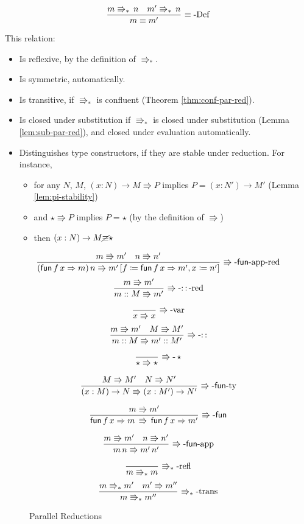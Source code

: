 \[
\frac{m\Rrightarrow_{\ast}\,n\quad m'\Rrightarrow_{\ast}\,n}{m\equiv m'}\,\operatorname{\equiv-Def}
\]
 
This relation:
\begin{itemize}
\item Is reflexive, by the definition of $\Rrightarrow_{\ast}$.
\item Is symmetric, automatically.
\item Is transitive, if $\Rrightarrow_{\ast}$ is confluent (Theorem \ref{thm:conf-par-red}).
\item Is closed under substitution if $\Rrightarrow_{\ast}$ is closed under substitution (Lemma \ref{lem:sub-par-red}), and closed under evaluation automatically.
\item Distinguishes type constructors, if they are stable under reduction.
For instance,
\begin{itemize}
\item for any $N$, $M$, $\left(x:N\right)\rightarrow M\Rrightarrow P$ implies $P=\left(x:N'\right)\rightarrow M'$ (Lemma \ref{lem:pi-stability})
\item and $\star\Rrightarrow P$ implies $P=\star$ (by the definition of $\Rrightarrow$)
\item then $\left(x:N\right)\rightarrow M\cancel{\equiv}\star$
\end{itemize}
\end{itemize}
\begin{figure}
\[
\frac{m\Rrightarrow m'\quad n\Rrightarrow n'}{\left(\mathsf{fun}\,f\,x\Rightarrow m\right)n\Rrightarrow m'\left[f\coloneqq\mathsf{fun}\,f\,x\Rightarrow m',x\coloneqq n'\right]}\,\operatorname{\Rrightarrow-\mathsf{fun}-app-red}
\]
\[
\frac{m\Rrightarrow m'}{m::M\Rrightarrow m'}\,\operatorname{\Rrightarrow-::-red}
\]
 
\[
\frac{\,}{x\Rrightarrow x}\,\operatorname{\Rrightarrow-var}
\]
\[
\frac{m\Rrightarrow m'\quad M\Rrightarrow M'}{m::M\Rrightarrow m'::M'}\,\operatorname{\Rrightarrow-::}
\]
 
\[
\frac{\,}{\star\Rrightarrow\star}\,\operatorname{\Rrightarrow-}\star
\]
 
\[
\frac{M\Rrightarrow M'\quad N\Rrightarrow N'}{\left(x:M\right)\rightarrow N\Rrightarrow\left(x:M'\right)\rightarrow N'}\,\operatorname{\Rrightarrow-\mathsf{fun}-ty}
\]
 
\[
\frac{m\Rrightarrow m'}{\mathsf{fun}\,f\,x\Rightarrow m\,\Rrightarrow\,\mathsf{fun}\,f\,x\Rightarrow m'}\,\operatorname{\Rrightarrow-\mathsf{fun}}
\]
 
\[
\frac{m\Rrightarrow m'\quad n\Rrightarrow n'}{m\,n\Rrightarrow m'\,n'}\,\operatorname{\Rrightarrow-\mathsf{fun}-app}
\]
 
\[
\frac{\,}{m\Rrightarrow_{\ast}m}\,\operatorname{\Rrightarrow_{\ast}-refl}
\]
\[
\frac{m\Rrightarrow_{\ast}m'\quad m'\Rrightarrow m''}{m\Rrightarrow_{\ast}m''}\,\operatorname{\Rrightarrow_{\ast}-trans}
\]
 
\caption{\SLang{} Parallel Reductions}
\label{fig:surface-reduction}
\end{figure}

